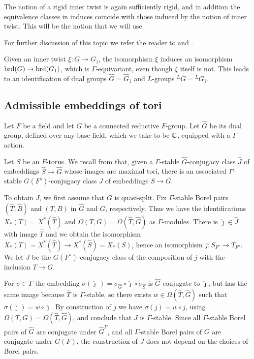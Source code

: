 \documentclass{article}
\theoremstyle{definition}
\numberwithin{equation}{section}
\renewcommand{\-}{\hyp{}}
\begin{document}
The notion of a rigid inner twist is again sufficiently rigid, and in addition the equivalence classes in induces coincide with those induced by the notion of inner twist. This will be the notion that we will use.

For further discussion of this topic we refer the reader to \cite{Vog93} and \cite{KalSimons}.

Given an inner twist $\xi : G \to G_1$, the isomorphism $\xi$ induces an isomorphism $\textrm{brd}(G) \to \textrm{brd}(G_1)$, which is $\Gamma$-equivariant, even though $\xi$ itself is not. This leads to an identification of dual groups $\hat G = \hat G_1$ and $L$\-groups $^LG = {^LG}_1$.


\subsection{Admissible embeddings of tori} \label{sub:adm}

Let $F$ be a field and let $G$ be a connected reductive $F$-group. Let $\hat G$ be its dual group, defined over any base field, which we take to be $\mathbb{C}$, equipped with a $\Gamma$-action.

Let $S$ be an $F$-torus. We recall from \cite[\S5.1]{KalRSP} that, given a $\Gamma$-stable $\hat G$-conjugacy class $\hat J$ of embeddings $\hat S \to \hat G$ whose images are maximal tori, there is an associated $\Gamma$-stable $G(F^s)$-conjugacy class $J$ of embeddings $S \to G$. 

To obtain $J$, we first assume that $G$ is quasi-split. Fix $\Gamma$-stable Borel pairs $(\hat T,\hat B)$ and $(T,B)$ in $\hat G$ and $G$, respectively. Thus we have the identifications $X_*(T)=X^*(\hat T)$ and $\Omega(T,G)=\Omega(\hat T,\hat G)$ as $\Gamma$-modules. There is $\hat\jmath \in \hat J$ with image $\hat T$ and we obtain the isomorphism $X_*(T)=X^*(\hat T) \to X^*(\hat S)=X_*(S)$, hence an isomorphism $j : S_{F^s} \to T_{F^s}$. We let $J$ be the $G(F^s)$-conjugacy class of the composition of $j$ with the inclusion $T \to G$.

For $\sigma \in \Gamma$ the embedding $\sigma(\hat\jmath\,)=\sigma_{\hat G}\circ \hat\jmath \circ \sigma_{\hat S}$ is $\hat G$-conjugate to $\hat\jmath$, but has the same image because $\hat T$ is $\Gamma$-stable, so there exists $w \in \Omega(\hat T,\hat G)$ such that $\sigma(\hat\jmath)=w\circ\hat\jmath$. By construction of $j$ we have $\sigma(j)=w\circ j$, using $\Omega(T,G)=\Omega(\hat T,\hat G)$, and conclude that $J$ is $\Gamma$-stable. Since all $\Gamma$-stable Borel pairs of $\hat G$ are conjugate under $\hat G^\Gamma$, and all $\Gamma$-stable Borel pairs of $G$ are conjugate under $G(F)$, the construction of $J$ does not depend on the choices of Borel pairs.
\end{document}
